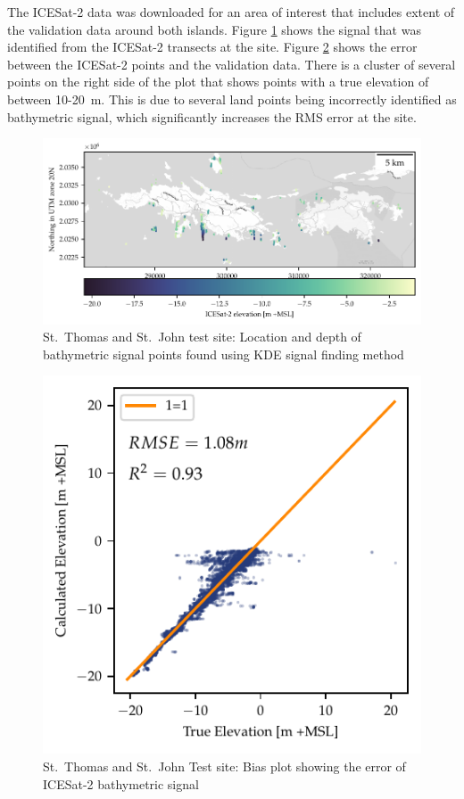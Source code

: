 The ICESat-2 data was downloaded for an area of interest that includes extent of the validation data around both islands. Figure \ref{fig:charlotte-amalie-photons} shows the signal that was identified from the ICESat-2 transects at the site. Figure \ref{fig:charlotte-amalie-biasplot} shows the error between the ICESat-2 points and the validation data. There is a cluster of several points on the right side of the plot that shows points with a true elevation of between 10-20~m. This is due to several land points being incorrectly identified as bathymetric signal, which significantly increases the RMS error at the site.

\begin{figure}[htbp]
    \centering
    \includegraphics{figures/charlotteamalie_photon_map.pdf}
    \caption{St.~Thomas and St.~John test site: Location and depth of bathymetric signal points found using KDE signal finding method}
    \label{fig:charlotte-amalie-photons}
\end{figure}

\begin{figure}[htbp]
    \centering
    \includegraphics{figures/charlotteamalie_lidar_estimated_vs_truth.pdf}
    \caption{St.~Thomas and St.~John Test site: Bias plot showing the error of ICESat-2 bathymetric signal}
    \label{fig:charlotte-amalie-biasplot}
\end{figure}

